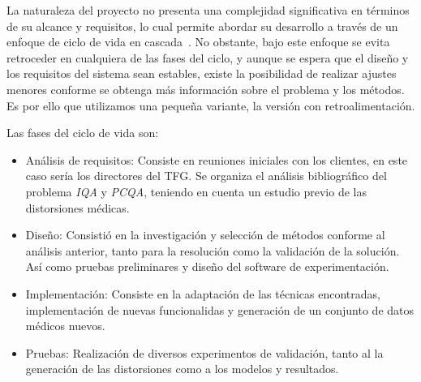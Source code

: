 La naturaleza del proyecto no presenta una complejidad significativa en términos 
de su alcance y requisitos, lo cual permite abordar su desarrollo a través de un 
enfoque de ciclo de vida en cascada~\cite{ModeloEnCascada}. 
No obstante, bajo este enfoque se evita retroceder en cualquiera de las fases 
del ciclo, y aunque se espera que el diseño y los requisitos del sistema sean 
estables, existe la posibilidad de realizar ajustes menores conforme se obtenga
más información sobre el problema y los métodos. 
Es por ello que utilizamos una pequeña variante, la versión con retroalimentación.
 
Las fases del ciclo de vida son: 
\begin{itemize}
  \item Análisis de requisitos: Consiste en reuniones iniciales con los clientes, 
    en este caso sería los directores del TFG. Se organiza el análisis bibliográfico 
    del problema \emph{IQA} y \emph{PCQA}\footnotemark[4], teniendo en cuenta un estudio previo 
    de las distorsiones médicas.
  \item Diseño: Consistió en la investigación y selección de métodos conforme 
    al análisis anterior, tanto para la resolución como la validación de la solución. 
    Así como pruebas preliminares y diseño del software de experimentación. 
  \item Implementación: Consiste en la adaptación de las técnicas encontradas, 
    implementación de nuevas funcionalidas y generación de un conjunto de datos 
    médicos nuevos.
  \item Pruebas: Realización de diversos experimentos de validación, tanto al 
    la generación de las distorsiones como a los modelos y resultados.
\end{itemize}

